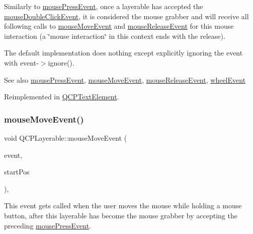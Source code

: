 Similarly to \mbox{\hyperlink{class_q_c_p_layerable_af6567604818db90f4fd52822f8bc8376}{mouse\+Press\+Event}}, once a layerable has accepted the \mbox{\hyperlink{class_q_c_p_layerable_a4171e2e823aca242dd0279f00ed2de81}{mouse\+Double\+Click\+Event}}, it is considered the mouse grabber and will receive all following calls to \mbox{\hyperlink{class_q_c_p_layerable_a9eee1ba47fd69be111059ca3881933e4}{mouse\+Move\+Event}} and \mbox{\hyperlink{class_q_c_p_layerable_aa0d79b005686f668622bbe66ac03ba2c}{mouse\+Release\+Event}} for this mouse interaction (a \char`\"{}mouse interaction\char`\"{} in this context ends with the release).

The default implementation does nothing except explicitly ignoring the event with {\ttfamily event-\/$>$ignore()}.

\begin{DoxySeeAlso}{See also}
\mbox{\hyperlink{class_q_c_p_layerable_af6567604818db90f4fd52822f8bc8376}{mouse\+Press\+Event}}, \mbox{\hyperlink{class_q_c_p_layerable_a9eee1ba47fd69be111059ca3881933e4}{mouse\+Move\+Event}}, \mbox{\hyperlink{class_q_c_p_layerable_aa0d79b005686f668622bbe66ac03ba2c}{mouse\+Release\+Event}}, \mbox{\hyperlink{class_q_c_p_layerable_a47dfd7b8fd99c08ca54e09c362b6f022}{wheel\+Event}} 
\end{DoxySeeAlso}


Reimplemented in \mbox{\hyperlink{class_q_c_p_text_element_a2272ff775ab385f612e9fd39773de7c0}{Q\+C\+P\+Text\+Element}}.

\mbox{\label{class_q_c_p_layerable_a9eee1ba47fd69be111059ca3881933e4}} 
\subsubsection{\texorpdfstring{mouseMoveEvent()}{mouseMoveEvent()}}
{\footnotesize\ttfamily void Q\+C\+P\+Layerable\+::mouse\+Move\+Event (\begin{DoxyParamCaption}\item[{Q\+Mouse\+Event $\ast$}]{event,  }\item[{const Q\+PointF \&}]{start\+Pos }\end{DoxyParamCaption})\hspace{0.3cm}{\ttfamily [protected]}, {\ttfamily [virtual]}}

This event gets called when the user moves the mouse while holding a mouse button, after this layerable has become the mouse grabber by accepting the preceding \mbox{\hyperlink{class_q_c_p_layerable_af6567604818db90f4fd52822f8bc8376}{mouse\+Press\+Event}}.

